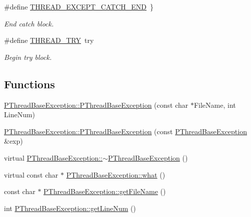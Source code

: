 \begin{DoxyCompactItemize}
\#define \hyperlink{group__EXCEPT__GROUP_gab885e9554b19d207b874259b5c5fd9be}{T\+H\+R\+E\+A\+D\+\_\+\+E\+X\+C\+E\+P\+T\+\_\+\+C\+A\+T\+C\+H\+\_\+\+E\+ND}~\}
\begin{DoxyCompactList}\small\item\em End catch block. \end{DoxyCompactList}\item 
\#define \hyperlink{group__EXCEPT__GROUP_ga517202bf1ba7e87014662a560bbcb43c}{T\+H\+R\+E\+A\+D\+\_\+\+T\+RY}~try
\begin{DoxyCompactList}\small\item\em Begin try block. \end{DoxyCompactList}\end{DoxyCompactItemize}
\subsection*{Functions}
\begin{DoxyCompactItemize}
\item 
\hyperlink{group__EXCEPT__GROUP_ga479c992ccbf4a39cd707a27906925601}{P\+Thread\+Base\+Exception\+::\+P\+Thread\+Base\+Exception} (const char $\ast$File\+Name, int Line\+Num)
\item 
\hyperlink{group__EXCEPT__GROUP_gaf6dded31d5ab6283d588f99a702241ec}{P\+Thread\+Base\+Exception\+::\+P\+Thread\+Base\+Exception} (const \hyperlink{classPThreadBaseException}{P\+Thread\+Base\+Exception} \&exp)
\item 
virtual \hyperlink{group__EXCEPT__GROUP_gae4edc60cd7923ef9305a1312cdbc9fc1}{P\+Thread\+Base\+Exception\+::$\sim$\+P\+Thread\+Base\+Exception} ()
\item 
virtual const char $\ast$ \hyperlink{group__EXCEPT__GROUP_ga4389169c01caec3fe93ac45a5d69a9ec}{P\+Thread\+Base\+Exception\+::what} ()
\item 
const char $\ast$ \hyperlink{group__EXCEPT__GROUP_ga4d72952887facf12a96971e964d3427b}{P\+Thread\+Base\+Exception\+::get\+File\+Name} ()
\item 
int \hyperlink{group__EXCEPT__GROUP_ga7a06d992e2dbfa1d283e6c6fb209fd62}{P\+Thread\+Base\+Exception\+::get\+Line\+Num} ()
\end{DoxyCompactItemize}
